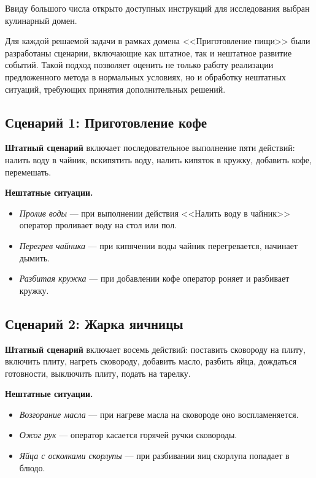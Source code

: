 Ввиду большого числа %
открыто доступных инструкций для исследования выбран кулинарный домен. 

Для каждой решаемой задачи в рамках домена <<Приготовление пищи>> были разработаны сценарии, включающие как штатное, так и нештатное развитие событий. 
Такой подход позволяет оценить не только работу реализации предложенного метода в нормальных условиях, но и обработку нештатных ситуаций, требующих принятия дополнительных решений.

\subsection*{Сценарий 1: Приготовление кофе}

\textbf{Штатный сценарий} включает последовательное выполнение пяти действий: налить воду в чайник, вскипятить воду, налить кипяток в кружку, добавить кофе, перемешать.

\textbf{Нештатные ситуации.}
\begin{itemize}
\item \textit{Пролив воды} --- при выполнении действия <<Налить воду в чайник>> оператор проливает воду на стол или пол.
\item \textit{Перегрев чайника} --- при кипячении воды чайник перегревается, начинает дымить. 
\item \textit{Разбитая кружка} --- при добавлении кофе оператор роняет и разбивает кружку.
\end{itemize}

\subsection*{Сценарий 2: Жарка яичницы}

\textbf{Штатный сценарий} включает восемь действий: поставить сковороду на плиту, включить плиту, нагреть сковороду, добавить масло, разбить яйца, дождаться готовности, выключить плиту, подать на тарелку.

\textbf{Нештатные ситуации.}
\begin{itemize}
\item \textit{Возгорание масла} --- при нагреве масла на сковороде оно воспламеняется.
\item \textit{Ожог рук} --- оператор касается горячей ручки сковороды. 
\item \textit{Яйца с осколками скорлупы} --- при разбивании яиц скорлупа попадает в блюдо. 
\end{itemize}

